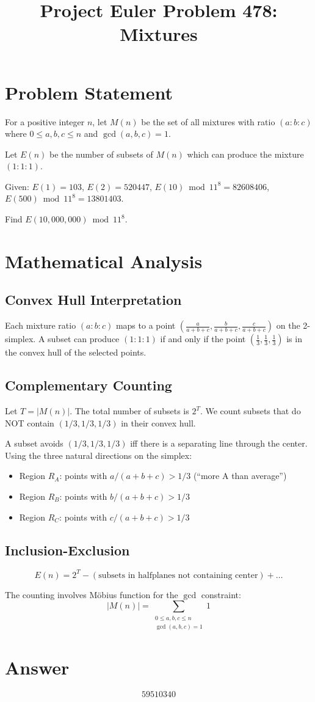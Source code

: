 \documentclass[12pt]{article}
\title{Project Euler Problem 478: Mixtures}
\author{}
\date{}
\begin{document}
\maketitle

\section{Problem Statement}
For a positive integer $n$, let $M(n)$ be the set of all mixtures with ratio $(a:b:c)$ where $0 \le a,b,c \le n$ and $\gcd(a,b,c) = 1$.

Let $E(n)$ be the number of subsets of $M(n)$ which can produce the mixture $(1:1:1)$.

Given: $E(1) = 103$, $E(2) = 520447$, $E(10) \bmod 11^8 = 82608406$, $E(500) \bmod 11^8 = 13801403$.

Find $E(10{,}000{,}000) \bmod 11^8$.

\section{Mathematical Analysis}

\subsection{Convex Hull Interpretation}
Each mixture ratio $(a:b:c)$ maps to a point $\left(\frac{a}{a+b+c}, \frac{b}{a+b+c}, \frac{c}{a+b+c}\right)$ on the 2-simplex. A subset can produce $(1:1:1)$ if and only if the point $\left(\frac{1}{3}, \frac{1}{3}, \frac{1}{3}\right)$ is in the convex hull of the selected points.

\subsection{Complementary Counting}
Let $T = |M(n)|$. The total number of subsets is $2^T$. We count subsets that do NOT contain $(1/3, 1/3, 1/3)$ in their convex hull.

A subset avoids $(1/3, 1/3, 1/3)$ iff there is a separating line through the center. Using the three natural directions on the simplex:

\begin{itemize}
    \item Region $R_A$: points with $a/(a+b+c) > 1/3$ (``more A than average'')
    \item Region $R_B$: points with $b/(a+b+c) > 1/3$
    \item Region $R_C$: points with $c/(a+b+c) > 1/3$
\end{itemize}

\subsection{Inclusion-Exclusion}
\[
E(n) = 2^T - (\text{subsets in halfplanes not containing center}) + \ldots
\]

The counting involves M\"obius function for the $\gcd$ constraint:
\[
|M(n)| = \sum_{\substack{0 \le a,b,c \le n \\ \gcd(a,b,c)=1}} 1
\]

\section{Answer}

\[
\boxed{59510340}
\]
\end{document}
